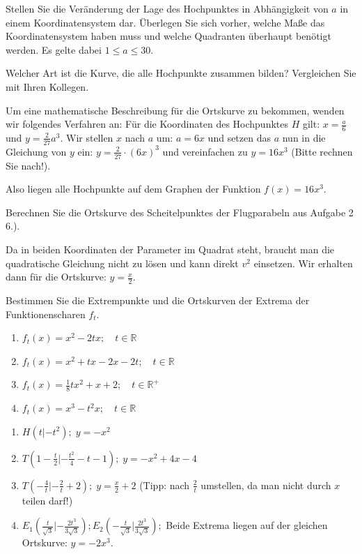 \documentclass[11pt,a4paper,twoside,fleqn]{article}
\begin{document}
Stellen Sie die Veränderung der Lage des Hochpunktes in Abhängigkeit
von $a$ in einem Koordinatensystem dar. Überlegen Sie sich vorher,
welche Maße das Koordinatensystem haben muss und welche Quadranten
überhaupt benötigt werden. Es gelte dabei $1\leq a\leq 30$. 

Welcher Art ist die Kurve, die alle Hochpunkte zusammen bilden?
Vergleichen Sie mit Ihren Kollegen.

Um eine mathematische Beschreibung für die Ortskurve zu bekommen,
wenden wir folgendes Verfahren an: 
Für die Koordinaten des Hochpunktes $H$ gilt: $x= \frac a 6$ und
$y=\frac 2 {27}a^3$. Wir stellen $x$ nach $a$ um: $a=6x$ und setzen
das $a$ nun in die Gleichung von $y$ ein: $y=\frac 2 {27}\cdot (6x)^3$
und vereinfachen zu $y=16x^3$ (Bitte rechnen Sie nach!).

Also liegen alle Hochpunkte auf dem Graphen der Funktion $f(x)=16x^3$.

\begin{question}

  Berechnen Sie die Ortskurve des Scheitelpunktes der Flugparabeln aus Aufgabe 2 6.).
\end{question}
\begin{solution}
  Da in beiden Koordinaten der Parameter im Quadrat steht, braucht man die quadratische Gleichung
  nicht zu lösen und kann direkt $v^2$ einsetzen. Wir erhalten dann für die Ortskurve: $y=\frac x 2$.
\end{solution}


\begin{question}
  Bestimmen Sie die Extrempunkte und die Ortskurven der Extrema der
  Funktionenscharen $f_t$.
  \begin{multicols}{2}
    \begin{enumerate}\itemsep0pt
    \item $f_t(x)=x^2-2tx;\quad t\in\mathbb{R}$
    \item $f_t(x)=x^2+tx-2x-2t;\quad t\in\mathbb{R}$
    \item $f_t(x)=\frac 1 8 tx^2+x+2;\quad t\in\mathbb{R}^+$
    \item $f_t(x)=x^3-t^2x;\quad t\in\mathbb{R}$
    \end{enumerate}
  \end{multicols}
\end{question}
\begin{solution}
  \begin{multicols}{2}
    \begin{enumerate}
    \item $H(t|-t^2);\;y=-x^2$
    \item $T(1-\frac t 2|-\frac {t^2} 4 -t -1);\; y=-x^2+4x-4$
    \item $T(-\frac 4 t|-\frac 2 t+2);\; y=\frac x 2 +2$ (Tipp: nach
      $\frac 2 t$ umstellen, da man nicht durch $x$ teilen darf!)
      \item $E_1(\frac t {\sqrt{3}}|-\frac{2t^3}{3\sqrt{3}}); 
             E_2(-\frac t {\sqrt{3}} | \frac{2t^3}{3\sqrt{3}});$
             Beide Extrema liegen auf der gleichen Ortskurve:
             $y=-2x^3$.
    \end{enumerate}
  \end{multicols}
\end{solution}
\end{document}
